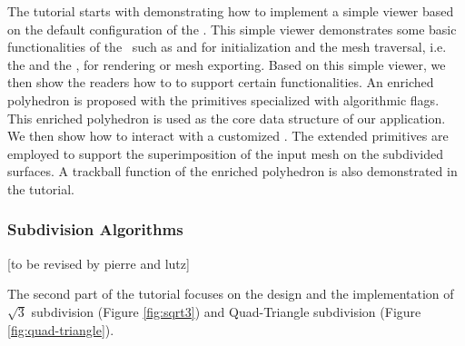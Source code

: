 \documentclass[letter,twocolumn]{article}
\begin{document}

The tutorial starts with demonstrating how to implement a simple
viewer based on the default configuration of the \cgalpoly . This
simple viewer demonstrates some basic functionalities of the
\cgalpoly\ such as  and  
for initialization and the mesh traversal, i.e. the 
and the , for rendering or mesh exporting. Based
on this simple viewer, we then show the readers how to
 to support certain functionalities. 
An enriched polyhedron is proposed with the primitives specialized
with algorithmic flags. This enriched polyhedron is used as the core
data structure of our application.  We then show how to interact with
a customized \poly.  The extended primitives are employed to support
the superimposition of the input mesh on the subdivided surfaces. A
trackball function of the enriched polyhedron is also demonstrated in
the tutorial.

\subsubsection*{Subdivision Algorithms}
[to be revised by pierre and lutz]

The second part of the tutorial focuses on the design and the
implementation of $\sqrt{3}$ subdivision (Figure \ref{fig:sqrt3}) 
and Quad-Triangle subdivision (Figure \ref{fig:quad-triangle}).  
\end{document}
